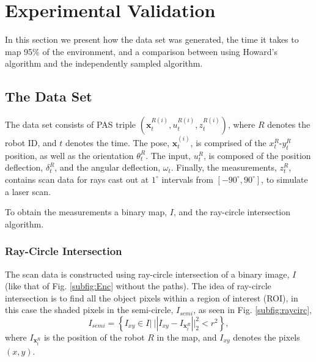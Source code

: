 \section{Experimental Validation}
\label{S:Exp}

In this section we present how the data set was generated, the time it takes to map 95\% of the environment, and a comparison between using Howard's algorithm and the independently sampled algorithm.  




\subsection{The Data Set}
\label{S:Exp:DataSet}

The data set consists of PAS triple $(\textbf{x}^{R(i)}_t,u^{R(i)}_t,z^{R(i)}_t)$, where $R$ denotes the robot ID, and $t$ denotes the time.  The pose, $\textbf{x}^{(i)}_t$, is comprised of the $x_t^R$-$y^R_t$ position, as well as the orientation $\theta^R_t$.  The input, $u^R_t$, is composed of the position deflection, $\delta^R_t$, and the angular deflection, $\omega_t$.  Finally, the measurements, $z^R_t$, contains scan data for rays cast out at $1^\circ$ intervals from $[-90^\circ,90^\circ]$, to simulate a laser scan.  

To obtain the measurements a binary map, $I$, and the ray-circle intersection algorithm.

\subsubsection{Ray-Circle Intersection}

The scan data is constructed using ray-circle intersection of a binary image, $I$ (like that of Fig. \ref{subfig:Enc} without the paths).  The idea of ray-circle intersection is to find all the object pixels within a region of interest (ROI), in this case the shaded pixels in the semi-circle, $I_{semi}$, as seen in Fig. \ref{subfig:raycirc}, 
\begin{equation}
I_{semi}=\left\{I_{xy}\in I |\  ||I_{xy}-I_{\textbf{x}_t^R}||_2^2<r^2 \right\},
\label{eq:Isemi}
\end{equation}
where $I_{\textbf{x}_t^R}$ is the position of the robot $R$ in the map, and $I_{xy}$ denotes the pixels $(x,y)$.

